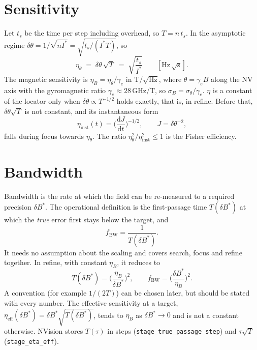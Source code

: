 \documentclass[11pt]{article}
\newcommand{\dd}{\mathrm{d}}
\newcommand{\Istar}{I^{\ast}}
\begin{document}
\section{Sensitivity}
Let $t_s$ be the time per step including overhead, so $T=n\,t_s$. In the asymptotic regime
$\delta\theta=1/\sqrt{n\Istar}=\sqrt{t_s/(\Istar T)}$, so
\begin{equation}
  \eta_\theta\;=\;\delta\theta\,\sqrt{T}\;=\;\sqrt{\frac{t_s}{\Istar}}\qquad[\mathrm{Hz}\,\sqrt{\mathrm{s}}].
\end{equation}
The magnetic sensitivity is $\eta_B=\eta_\theta/\gamma_e$ in $\mathrm{T}/\sqrt{\mathrm{Hz}}$, where
$\theta=\gamma_e B$ along the NV axis with the gyromagnetic ratio $\gamma_e\approx28$\,GHz/T, so $\sigma_B=\sigma_\theta/\gamma_e$.
$\eta$ is a constant of the locator only when $\delta\theta\propto T^{-1/2}$ holds
exactly, that is, in refine. Before that, $\delta\theta\sqrt T$ is not constant, and its instantaneous form
\begin{equation}
  \eta_{\mathrm{inst}}(t)=\Big(\frac{\dd J}{\dd t}\Big)^{-1/2},\qquad J=\delta\theta^{-2},
\end{equation}
falls during focus towards $\eta_\theta$. The ratio $\eta_\theta^2/\eta_{\mathrm{inst}}^2\le1$ is the Fisher efficiency.

\section{Bandwidth}
Bandwidth is the rate at which the field can be re-measured to a required precision $\delta B^{\ast}$. The operational
definition is the first-passage time $T(\delta B^{\ast})$ at which the \emph{true} error first stays below the target,
and
\begin{equation}
  f_{\mathrm{BW}}=\frac{1}{T(\delta B^{\ast})}.
\end{equation}
It needs no assumption about the scaling and covers search, focus and refine together. In refine, with constant
$\eta_B$, it reduces to
\begin{equation}
  T(\delta B^{\ast})=\Big(\frac{\eta_B}{\delta B^{\ast}}\Big)^{2},\qquad f_{\mathrm{BW}}=\Big(\frac{\delta B^{\ast}}{\eta_B}\Big)^{2}.
\end{equation}
A convention (for example $1/(2T)$) can be chosen later, but should be stated with every number. The effective
sensitivity at a target, $\eta_{\mathrm{eff}}(\delta B^{\ast})=\delta B^{\ast}\sqrt{T(\delta B^{\ast})}$, tends to
$\eta_B$ as $\delta B^{\ast}\to0$ and is not a constant otherwise. NVision stores $T(\tau)$ in steps
(\texttt{stage\_true\_passage\_step}) and $\tau\sqrt{T}$ (\texttt{stage\_eta\_eff}).
\end{document}
